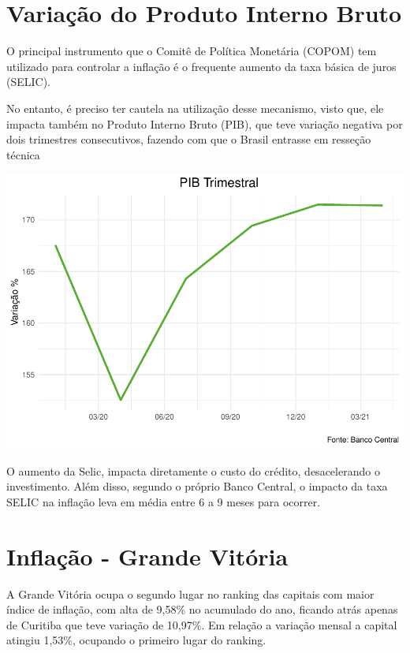 \documentclass[100,a4paperpaper,]{article}
\begin{document}
\section{Variação do Produto Interno Bruto} 
 \vspace{0,5cm}

O principal instrumento que o Comitê de Política Monetária (COPOM) tem
utilizado para controlar a inflação é o frequente aumento da taxa básica
de juros (SELIC).

No entanto, é preciso ter cautela na utilização desse mecanismo, visto
que, ele impacta também no Produto Interno Bruto (PIB), que teve
variação negativa por dois trimestres consecutivos, fazendo com que o
Brasil entrasse em resseção técnica

\includegraphics{inflacao_files/figure-latex/PIB trimestral-1.pdf}

O aumento da Selic, impacta diretamente o custo do crédito,
desacelerando o investimento. Além disso, segundo o próprio Banco
Central, o impacto da taxa SELIC na inflação leva em média entre 6 a 9
meses para ocorrer.

\newpage

\section{Inflação - Grande Vitória} 
 \vspace{0,25cm}

A Grande Vitória ocupa o segundo lugar no ranking das capitais com maior
índice de inflação, com alta de 9,58\% no acumulado do ano, ficando
atrás apenas de Curitiba que teve variação de 10,97\%. Em relação a
variação mensal a capital atingiu 1,53\%, ocupando o primeiro lugar do
ranking.
\end{document}
